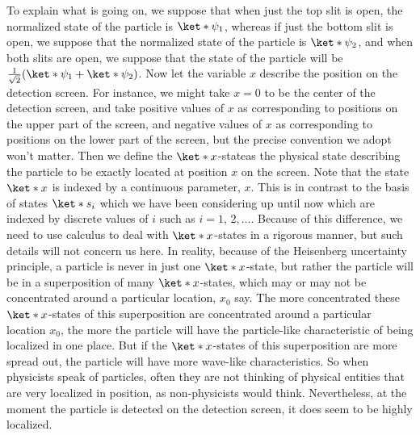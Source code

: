 \documentclass[12pt]{report}
\begin{document}
    To explain what is going on, we suppose that when just the top slit is open, the normalized state of the particle is $\ket*{\psi_1}$,\label{psi_slit} whereas if just the bottom slit is open, we suppose that the normalized state of the particle is $\ket*{\psi_2}$, and when both slits are open, we suppose that the state of the particle will be $\frac{1}{\sqrt{2}}(\ket*{\psi_1}+\ket*{\psi_2})$. 
     Now let the variable $x$ describe the position on the detection screen. For instance, we might take $x=0$ to be the center of the detection screen, and take  positive values of $x$ as corresponding to positions on the upper part of the screen, and negative values of $x$ as corresponding to positions on the lower part of the screen, but the precise convention we adopt won't matter. Then we define the  $\ket*{x}$-state\footnotemark\;as the physical state describing the particle to be exactly located at position $x$ on the screen. Note that the state $\ket*{x}$ is indexed by a continuous parameter, $x$. This is in contrast to the basis of states $\ket*{s_i}$ which we have been considering up until now which are indexed by discrete values of $i$ such as $i=1,\,2,\ldots.$ Because of this difference, we need to use calculus to deal with $\ket*{x}$-states in a rigorous manner, but such details will not concern us here. In reality, because of the Heisenberg uncertainty principle, a particle is never in just one $\ket*{x}$-state, but rather the particle will be in a superposition of many $\ket*{x}$-states, which may or may not be concentrated around a particular location, $x_0$ say. The more concentrated these  $\ket*{x}$-states of this superposition are concentrated around a particular location $x_0$, the more the particle will have the particle-like characteristic of being localized in one place. But if the  $\ket*{x}$-states of this superposition are more spread out, the particle will have more wave-like characteristics. So when physicists speak of particles, often they are not thinking of physical entities that are very localized in position, as non-physicists would think. Nevertheless, at the moment the particle is detected on the detection screen, it does seem to be highly localized.
\end{document}
